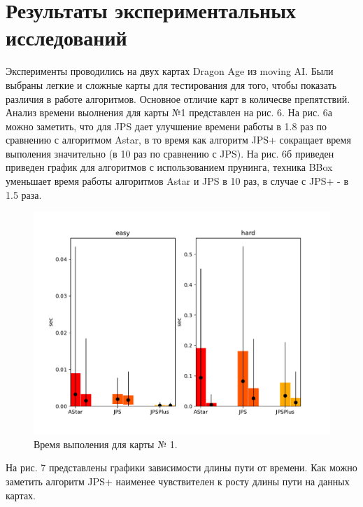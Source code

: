 \documentclass{physlab}
\begin{document}
\section{Результаты экспериментальных исследований}
Эксперименты проводились на двух картах Dragon Age из moving AI. Были выбраны легкие и сложные карты для тестирования для того, чтобы показать различия в работе алгоритмов. Основное отличие карт в количесве препятствий. Анализ времени выолнения для карты №1 представлен на рис. 6. На рис. 6а можно заметить, что для JPS дает улучшение времени работы в 1.8 раз по сравнению с алгоритмом Astar, в то время как алгоритм JPS+ сокращает время выполения значительно (в 10 раз по сравнению с JPS). На рис. 6б приведен приведен график для алгоритмов  с использованием прунинга, техника BBox уменьшает время работы алгоритмов Astar и JPS в 10 раз, в случае с JPS+ - в 1.5 раза.  
\begin{figure}[H]
	\includegraphics[width=0.93\linewidth]{error.pdf}
\caption{Время выполения для карты № 1.}
\end{figure} 
На рис. 7 представлены графики зависимости длины пути от времени. Как можно заметить алгоритм JPS+ наименее чувствителен к росту длины пути на данных картах. 
\end{document}
